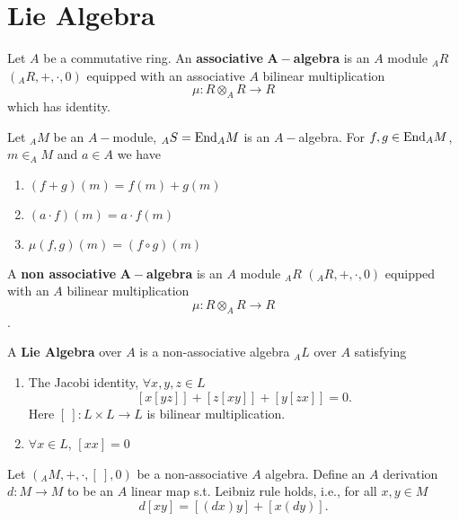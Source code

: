 \section{Lie Algebra}
\begin{definition}
    Let $A$ be a commutative ring. An \textbf{associative }$\mathbf{A-}$\textbf{algebra} is an $A$ module $_AR$ $(_AR, +, \cdot, 0)$ equipped with an associative $A$ bilinear multiplication
    \[\mu: R\otimes_A R\to R\]
    which has identity.
\end{definition}

\begin{example}
    Let $_AM$ be an $A-$module, $_AS=\text{End}_A M$ is an $A-$algebra. For $f, g\in \text{End}_A M$, $m\in _AM$ and $a\in A$ we have
    \begin{enumerate}
        \item $(f+g)(m)=f(m)+g(m)$
        \item $(a\cdot f)(m)=a\cdot f(m)$
        \item $\mu(f, g)(m)=(f\circ g)(m)$
    \end{enumerate}
\end{example}

\begin{definition}
    A \textbf{non associative }$\mathbf{A-}$\textbf{algebra} is an $A$ module $_AR$ $(_AR, +, \cdot, 0)$ equipped with an $A$ bilinear multiplication
    \[\mu: R\otimes_A R\to R\].
\end{definition}

\begin{definition}
    A \textbf{Lie Algebra} over $A$ is a non-associative algebra $_AL$ over $A$ satisfying
    \begin{enumerate}
        \item The Jacobi identity, $\forall x, y, z\in L$
        \[
            [x[yz]]+[z[xy]]+[y[zx]]=0.
        \]
        Here $[\ ]:L\times L\to L$ is bilinear multiplication.
        \item $\forall x\in L$, $[xx]=0$
    \end{enumerate}
\end{definition}

\begin{definition}
    Let $(_AM, +, \cdot, [\ ], 0)$ be a non-associative $A$ algebra. Define an $A$ derivation $d:M\to M$ to be an $A$ linear map s.t. Leibniz rule holds, i.e., for all $x, y\in M$
    \[
        d[xy]=[(dx)y]+[x(dy)] .  
    \]
\end{definition}

\begin{example}
    
\end{example}